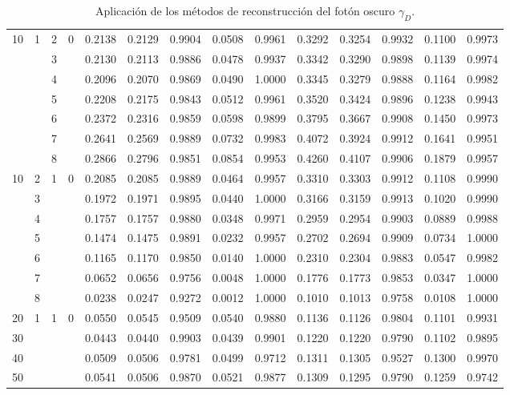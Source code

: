 \begin{landscape}
\begin{table}[!t]
\begin{tabular}{|cccc|c|cc|cc|c|cc|cc|}
\midrule
10 	& 1 & 2 & 0 	& 0.2138& 0.2129& 0.9904& 0.0508& 0.9961& 0.3292& 0.3254& 0.9932& 0.1100& 0.9973\\
	& 	& 3 & 		& 0.2130& 0.2113& 0.9886& 0.0478& 0.9937& 0.3342& 0.3290& 0.9898& 0.1139& 0.9974\\
	& 	& 4 & 		& 0.2096& 0.2070& 0.9869& 0.0490& 1.0000& 0.3345& 0.3279& 0.9888& 0.1164& 0.9982\\
	& 	& 5 & 		& 0.2208& 0.2175& 0.9843& 0.0512& 0.9961& 0.3520& 0.3424& 0.9896& 0.1238& 0.9943\\
	&	& 6 &		& 0.2372& 0.2316& 0.9859& 0.0598& 0.9899& 0.3795& 0.3667& 0.9908& 0.1450& 0.9973\\
	& 	& 7 & 		& 0.2641& 0.2569& 0.9889& 0.0732& 0.9983& 0.4072& 0.3924& 0.9912& 0.1641& 0.9951\\
	&	& 8 & 		& 0.2866& 0.2796& 0.9851& 0.0854& 0.9953& 0.4260& 0.4107& 0.9906& 0.1879& 0.9957\\
\midrule
10 	& 2 & 1 & 0 	& 0.2085& 0.2085& 0.9889& 0.0464& 0.9957& 0.3310& 0.3303& 0.9912& 0.1108& 0.9990\\
	& 3 & 	& 		& 0.1972& 0.1971& 0.9895& 0.0440& 1.0000& 0.3166& 0.3159& 0.9913& 0.1020& 0.9990\\
	& 4 & 	& 		& 0.1757& 0.1757& 0.9880& 0.0348& 0.9971& 0.2959& 0.2954& 0.9903& 0.0889& 0.9988\\
	& 5 & 	& 		& 0.1474& 0.1475& 0.9891& 0.0232& 0.9957& 0.2702& 0.2694& 0.9909& 0.0734& 1.0000\\
	& 6 & 	& 		& 0.1165& 0.1170& 0.9850& 0.0140& 1.0000& 0.2310& 0.2304& 0.9883& 0.0547& 0.9982\\
	& 7 & 	& 		& 0.0652& 0.0656& 0.9756& 0.0048& 1.0000& 0.1776& 0.1773& 0.9853& 0.0347& 1.0000\\
	& 8 & 	& 		& 0.0238& 0.0247& 0.9272& 0.0012& 1.0000& 0.1010& 0.1013& 0.9758& 0.0108& 1.0000\\
\midrule
20 	& 1 & 1 & 0 	& 0.0550& 0.0545& 0.9509& 0.0540& 0.9880& 0.1136& 0.1126& 0.9804& 0.1101& 0.9931\\
30 	& 	& 	& 		& 0.0443& 0.0440& 0.9903& 0.0439& 0.9901& 0.1220& 0.1220&	0.9790& 0.1102& 0.9895\\
40 	& 	& 	& 		& 0.0509& 0.0506& 0.9781& 0.0499& 0.9712& 0.1311& 0.1305& 0.9527&	0.1300& 0.9970\\
50 	& 	& 	& 		& 0.0541& 0.0506& 0.9870& 0.0521& 0.9877& 0.1309& 0.1295&	0.9790&	0.1259& 0.9742\\
\bottomrule 
\end{tabular}
\caption{Aplicación de los métodos de reconstrucción del fotón oscuro $\gamma_D$.}
\label{fotones_reconstruidos}
\end{table}
\end{landscape} 













